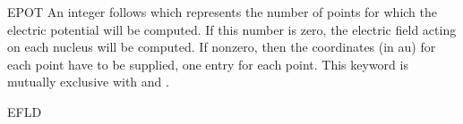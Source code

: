 \begin{keywordlist}
\item[EPOT]
An integer follows which represents the
number of points for which the electric potential will be computed. If
this number is zero, the electric field acting on each nucleus will be
computed. If nonzero, then the coordinates (in au) for each point have to be
supplied, one entry for each point.
This keyword is mutually exclusive with  and .
\item[EFLD]

\end{keywordlist}
